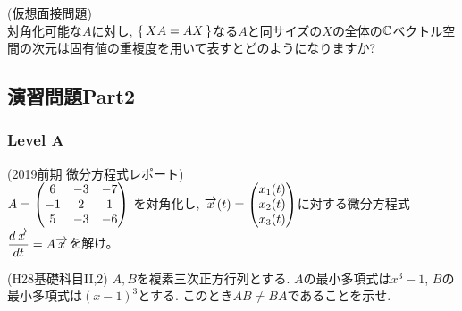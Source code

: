 \begin{egans}

\end{egans}


\begin{egprob} (仮想面接問題) \\
対角化可能な$A$に対し, $\set{XA = AX}$なる$A$と同サイズの$X$の全体の$\mathbb{C}$ベクトル空間の次元は固有値の重複度を用いて表すとどのようになりますか?
\end{egprob}






\subsection{演習問題Part2}
\subsubsection{Level A}
\begin{prob} (2019前期 微分方程式レポート)\\
$A=
\begin{pmatrix}
6 & -3 & -7\\
-1 & 2 & 1\\
5 & -3 & -6
\end{pmatrix}$
を対角化し, $\overrightarrow{x}(t) = \begin{pmatrix} x_1(t)\\ x_2(t)\\ x_3(t) \end{pmatrix}$に対する微分方程式$\dfrac{d\overrightarrow{x}}{dt} = A\overrightarrow{x}$を解け。
\end{prob}


\begin{prob} (H28基礎科目II,2)
$A,B$を複素三次正方行列とする. $A$の最小多項式は$x^3-1$, $B$の最小多項式は$(x-1)^3$とする. このとき$AB\neq BA$であることを示せ.
\end{prob}

